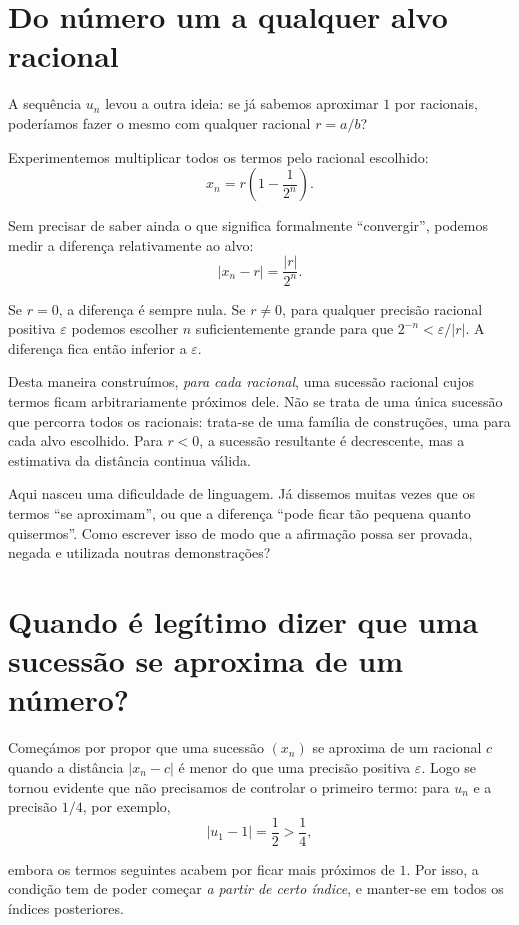 \documentclass[11pt,a4paper]{article}
\begin{document}
\section{Do número um a qualquer alvo racional}

A sequência $u_n$ levou a outra ideia: se já sabemos aproximar $1$ por racionais, poderíamos fazer o mesmo com qualquer racional $r=a/b$?

Experimentemos multiplicar todos os termos pelo racional escolhido:
\[
 x_n=r\left(1-\frac1{2^n}\right).
\]

Sem precisar de saber ainda o que significa formalmente ``convergir'', podemos medir a diferença relativamente ao alvo:
\[
 \boxed{|x_n-r|=\frac{|r|}{2^n}.}
\]

Se $r=0$, a diferença é sempre nula. Se $r\ne0$, para qualquer precisão racional positiva $\varepsilon$ podemos escolher $n$ suficientemente grande para que $2^{-n}<\varepsilon/|r|$. A diferença fica então inferior a $\varepsilon$.

Desta maneira construímos, \emph{para cada racional}, uma sucessão racional cujos termos ficam arbitrariamente próximos dele. Não se trata de uma única sucessão que percorra todos os racionais: trata-se de uma família de construções, uma para cada alvo escolhido. Para $r<0$, a sucessão resultante é decrescente, mas a estimativa da distância continua válida.

Aqui nasceu uma dificuldade de linguagem. Já dissemos muitas vezes que os termos ``se aproximam'', ou que a diferença ``pode ficar tão pequena quanto quisermos''. Como escrever isso de modo que a afirmação possa ser provada, negada e utilizada noutras demonstrações?

\section{Quando é legítimo dizer que uma sucessão se aproxima de um número?}

Começámos por propor que uma sucessão $(x_n)$ se aproxima de um racional $c$ quando a distância $|x_n-c|$ é menor do que uma precisão positiva $\varepsilon$. Logo se tornou evidente que não precisamos de controlar o primeiro termo: para $u_n$ e a precisão $1/4$, por exemplo,
\[
 |u_1-1|=\frac12>\frac14,
\]

embora os termos seguintes acabem por ficar mais próximos de $1$. Por isso, a condição tem de poder começar \emph{a partir de certo índice}, e manter-se em todos os índices posteriores.
\end{document}
